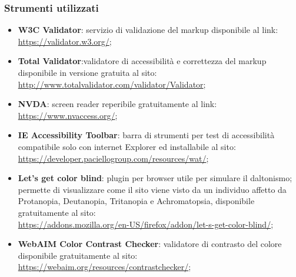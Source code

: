 \documentclass[a4paper,12pt]{article}
\begin{document}
\subsubsection{Strumenti utilizzati}
\begin{itemize}
	\item \textbf{W3C Validator}: servizio di validazione del markup disponibile al link:\\
	\url{https://validator.w3.org/};
	
	\item \textbf{Total Validator}:validatore di accessibilità e correttezza del markup disponibile in versione gratuita al sito:\\
	\url{http://www.totalvalidator.com/validator/Validator};
	
	\item \textbf{NVDA}: screen reader reperibile gratuitamente al link:\\
	\url{https://www.nvaccess.org/};
	
	\item \textbf{IE Accessibility Toolbar}: barra di strumenti per test di accessibilità compatibile solo con internet Explorer ed installabile al sito:\\
	\url{https://developer.paciellogroup.com/resources/wat/};
	
	\item \textbf{Let's get color blind}: plugin per browser utile per simulare il daltonismo; permette di visualizzare come il sito viene visto da un individuo affetto da Protanopia, Deutanopia, Tritanopia e Achromatopsia, disponibile gratuitamente al sito:\\
	\url{https://addons.mozilla.org/en-US/firefox/addon/let-s-get-color-blind/};
	
	\item \textbf{WebAIM Color Contrast Checker}: validatore di contrasto del colore disponibile gratuitamente al sito:\\
	\url{https://webaim.org/resources/contrastchecker/};
\end{itemize}
\end{document}
